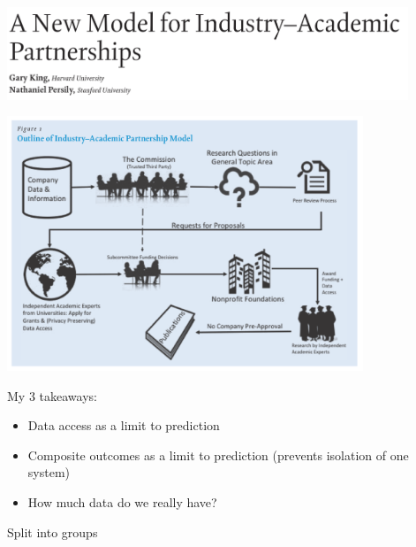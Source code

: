 \documentclass[aspectratio=169]{beamer}
\begin{document}
\begin{frame}

\begin{center}
\includegraphics[width = 0.9\textwidth]{figures/king_new_2020_title}
\end{center}

\end{frame}
\begin{frame}

\begin{center}
\includegraphics[width = 0.8\textwidth]{figures/king_new_2020_fig1}
\end{center}

\end{frame}
\begin{frame}

My 3 takeaways:
\begin{itemize}
\item Data access as a limit to prediction
\pause
\item Composite outcomes as a limit to prediction (prevents isolation of one system)
\pause
\item How much data do we really have?
\end{itemize}

\end{frame}
\begin{frame}

Split into groups

\end{frame}
\end{document}
